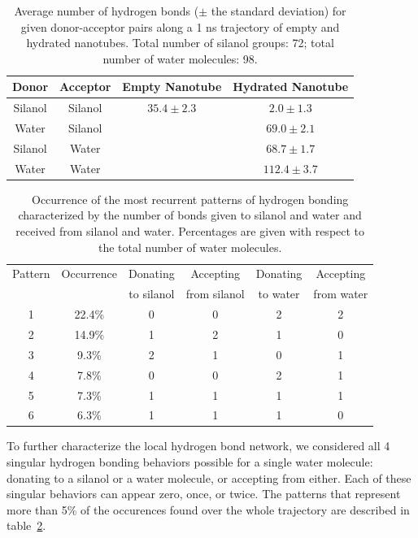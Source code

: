 \documentclass[thesis]{subfiles}
\begin{document}
\begin{table}[t]
\centering
\begin{tabular}{|c|c|c|c|}
\hline
Donor   & Acceptor & Empty Nanotube  & Hydrated Nanotube \\ \hline
Silanol & Silanol  & $35.4 \pm 2.3$  & $2.0  \pm 1.3$    \\ \hline
Water   & Silanol  &                 & $69.0 \pm 2.1$    \\ \hline
Silanol & Water    &                 & $68.7 \pm 1.7$    \\ \hline
Water   & Water    &                 & $112.4 \pm 3.7$   \\ \hline
\end{tabular}
\caption{Average number of hydrogen bonds ($\pm$ the standard deviation) for given donor-acceptor pairs along a 1 ns trajectory of empty and hydrated nanotubes. Total number of silanol groups: 72; total number of water molecules: 98.}
\label{tab:imogolite:hbonds:count}
\end{table}

\begin{table}[t]
\centering
\begin{tabular}{|c|c|c|c|c|c|}
\hline
Pattern & Occurrence & Donating & Accepting & Donating & Accepting\\
 & & to silanol & from silanol & to water & from water \\ \hline
1 & 22.4\% & 0 & 0 & 2 & 2 \\ \hline
2 & 14.9\% & 1 & 2 & 1 & 0 \\ \hline
3 & 9.3\% & 2 & 1 & 0 & 1 \\ \hline
4 & 7.8\% & 0 & 0 & 2 & 1 \\ \hline
5 & 7.3\% & 1 & 1 & 1 & 1 \\ \hline
6 & 6.3\% & 1 & 1 & 1 & 0 \\ \hline
\end{tabular}
\caption{Occurrence of the most recurrent patterns of hydrogen bonding characterized by the number of bonds given to silanol and water and received from silanol and water. Percentages are given with respect to the total number of water molecules.}
\label{tab:imogolite:hbonds:patterns}
\end{table}


To further characterize the local hydrogen bond network, we considered all 4
singular hydrogen bonding behaviors possible for a single water molecule:
donating to a silanol or a water molecule, or accepting from either. Each of
these singular behaviors can appear zero, once, or twice. The patterns that
represent more than {5\%} of the occurences found over the whole trajectory are
described in table~\ref{tab:imogolite:hbonds:patterns}.
\end{document}
